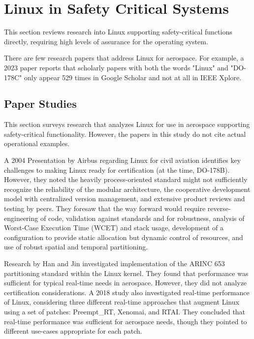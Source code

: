 \section{Linux in Safety Critical Systems}
\label{sec:open-source-linux}

This section reviews research into Linux supporting safety-critical functions directly, requiring high levels of assurance for the operating system.

There are few research papers that address Linux for aerospace. For example, a 2023 paper \cite{vanderleest2023avionics} reports that scholarly papers with both the words "Linux" and "DO-178C" only appear 529 times in Google Scholar and not at all in IEEE Xplore.

\subsection{Paper Studies}

This section surveys research that analyzes Linux for use in aerospace supporting safety-critical functionality. However, the papers in this study do not cite actual operational examples.

A 2004 Presentation by Airbus regarding Linux for civil aviation \cite{goiffon2004} identifies key challenges to making Linux ready for certification (at the time, DO-178B). However, they noted the heavily process-oriented standard might not sufficiently recognize the reliability of the modular architecture, the cooperative development model with centralized version management, and extensive product reviews and testing by peers. They foresaw that the way forward would require reverse-engineering of code, validation against standards and for robustness, analysis of Worst-Case Execution Time (WCET) and stack usage, development of a configuration to provide static allocation but dynamic control of resources, and use of robust spatial and temporal partitioning.

Research by Han and Jin \cite{han2012} investigated implementation of the ARINC 653 partitioning standard within the Linux kernel. They found that performance was sufficient for typical real-time needs in aerospace. However, they did not analyze certification considerations. A 2018 study \cite{liu2018} also investigated real-time performance of Linux, considering three different real-time approaches that augment Linux using a set of patches: Preempt\_RT, Xenomai, and RTAI. They concluded that real-time performance was sufficient for aerospace needs, though they pointed to different use-cases appropriate for each patch.

